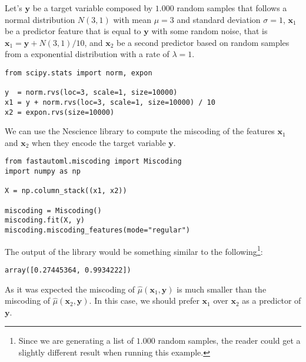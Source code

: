 \begin{example}

Let's $\mathbf{y}$ be a target variable composed by $1.000$ random samples that follows a normal distribution $N(3,1)$ with mean $\mu = 3$ and standard deviation $\sigma = 1$, $\mathbf{x}_1$ be a predictor feature that is equal to $\mathbf{y}$ with some random noise, that is $\mathbf{x}_1 = \mathbf{y} + N(3, 1) / 10$, and $\mathbf{x}_2$ be a second predictor based on random samples from a exponential distribution with a rate of $\lambda = 1$.

\begin{sourcecode}
{\scriptsize \begin{verbatim}
from scipy.stats import norm, expon

y  = norm.rvs(loc=3, scale=1, size=10000)
x1 = y + norm.rvs(loc=3, scale=1, size=10000) / 10
x2 = expon.rvs(size=10000)
\end{verbatim}}
\end{sourcecode}

We can use the Nescience library to compute the miscoding of the features $\mathbf{x}_1$ and $\mathbf{x}_2$ when they encode the target variable $\mathbf{y}$.

\begin{sourcecode}
{\scriptsize \begin{verbatim}
from fastautoml.miscoding import Miscoding
import numpy as np

X = np.column_stack((x1, x2))

miscoding = Miscoding()
miscoding.fit(X, y)
miscoding.miscoding_features(mode="regular")
\end{verbatim}}
\end{sourcecode}

The output of the library would be something similar to the following\footnote{Since we are generating a list of $1.000$ random samples, the reader could get a slightly different result when running this example.}:

\begin{sourcecode}
{\scriptsize \begin{verbatim}
array([0.27445364, 0.9934222])
\end{verbatim}}
\end{sourcecode}

As it was expected the miscoding of $\hat\mu(\mathbf{x}_1, \mathbf{y})$ is much smaller than the miscoding of $\hat\mu(\mathbf{x}_2, \mathbf{y})$. In this case, we should prefer $\mathbf{x}_1$ over $\mathbf{x}_2$ as a predictor of $\mathbf{y}$.

\end{example}


